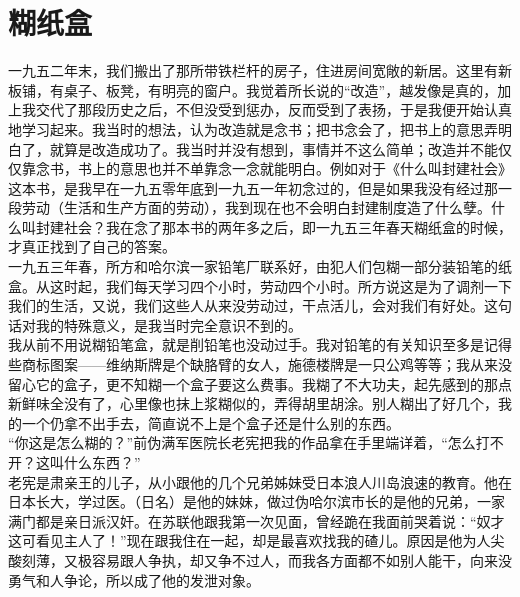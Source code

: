 \fancyhead[RO]{} %
\fancyhead[LE]{} %
\chapter*{糊纸盒}
\thispagestyle{empty}
一九五二年末，我们搬出了那所带铁栏杆的房子，住进房间宽敞的新居。这里有新板铺，有桌子、板凳，有明亮的窗户。我觉着所长说的“改造”，越发像是真的，加上我交代了那段历史之后，不但没受到惩办，反而受到了表扬，于是我便开始认真地学习起来。我当时的想法，认为改造就是念书；把书念会了，把书上的意思弄明白了，就算是改造成功了。我当时并没有想到，事情并不这么简单；改造并不能仅仅靠念书，书上的意思也并不单靠念一念就能明白。例如对于《什么叫封建社会》这本书，是我早在一九五零年底到一九五一年初念过的，但是如果我没有经过那一段劳动（生活和生产方面的劳动），我到现在也不会明白封建制度造了什么孽。什么叫封建社会？我在念了那本书的两年多之后，即一九五三年春天糊纸盒的时候，才真正找到了自己的答案。\\

一九五三年春，所方和哈尔滨一家铅笔厂联系好，由犯人们包糊一部分装铅笔的纸盒。从这时起，我们每天学习四个小时，劳动四个小时。所方说这是为了调剂一下我们的生活，又说，我们这些人从来没劳动过，干点活儿，会对我们有好处。这句话对我的特殊意义，是我当时完全意识不到的。\\

我从前不用说糊铅笔盒，就是削铅笔也没动过手。我对铅笔的有关知识至多是记得些商标图案——维纳斯牌是个缺胳臂的女人，施德楼牌是一只公鸡等等；我从来没留心它的盒子，更不知糊一个盒子要这么费事。我糊了不大功夫，起先感到的那点新鲜味全没有了，心里像也抹上浆糊似的，弄得胡里胡涂。别人糊出了好几个，我的一个仍拿不出手去，简直说不上是个盒子还是什么别的东西。\\

“你这是怎么糊的？”前伪满军医院长老宪把我的作品拿在手里端详着，“怎么打不开？这叫什么东西？”\\

老宪是肃亲王的儿子，从小跟他的几个兄弟姊妹受日本浪人川岛浪速的教育。他在日本长大，学过医。（日名）是他的妹妹，做过伪哈尔滨市长的是他的兄弟，一家满门都是亲日派汉奸。在苏联他跟我第一次见面，曾经跪在我面前哭着说：“奴才这可看见主人了！”现在跟我住在一起，却是最喜欢找我的碴儿。原因是他为人尖酸刻薄，又极容易跟人争执，却又争不过人，而我各方面都不如别人能干，向来没勇气和人争论，所以成了他的发泄对象。\\

